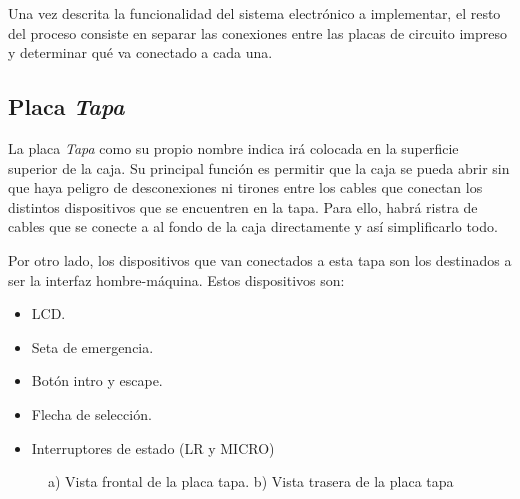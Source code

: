 Una vez descrita la funcionalidad del sistema electrónico a implementar, el resto del proceso consiste en 
separar las conexiones entre las placas de circuito impreso y determinar qué va conectado a cada una.

\subsection{Placa \textit{Tapa}}

La placa \textit{Tapa} como su propio nombre indica irá colocada en la superficie superior de la caja. Su 
principal función es permitir que la caja se pueda abrir sin que haya peligro de desconexiones ni tirones
entre los cables que conectan los distintos dispositivos que se encuentren en la tapa. Para ello, habrá
ristra de cables que se conecte a al fondo de la caja directamente y así simplificarlo todo.

Por otro lado, los dispositivos que van conectados a esta tapa son los destinados a ser la interfaz 
hombre-máquina. Estos dispositivos son:
\begin{itemize}
    \item LCD.
    \item Seta de emergencia.
    \item Botón intro y escape.
    \item Flecha de selección.
    \item Interruptores de estado (LR y MICRO)
\end{itemize}

\begin{figure}[htpb]%
    \centering 
    \hspace{10pt}%
    \caption{a) Vista frontal de la placa tapa. b) Vista trasera de la placa tapa}
    \label{fig:placatapa} 
    \end{figure} 

